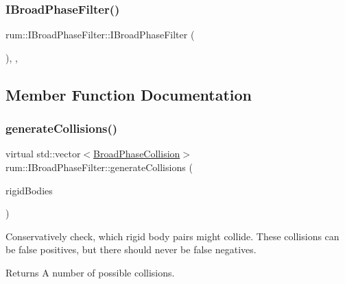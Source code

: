 \mbox{\label{classrum_1_1_i_broad_phase_filter_ae301bb63e91192f2edd60cd258ea02c7}} 
\subsubsection{\texorpdfstring{I\+Broad\+Phase\+Filter()}{IBroadPhaseFilter()}}
{\footnotesize\ttfamily rum\+::\+I\+Broad\+Phase\+Filter\+::\+I\+Broad\+Phase\+Filter (\begin{DoxyParamCaption}{ }\end{DoxyParamCaption})\hspace{0.3cm}{\ttfamily [explicit]}, {\ttfamily [protected]}, {\ttfamily [default]}}



\subsection{Member Function Documentation}
\mbox{\label{classrum_1_1_i_broad_phase_filter_a241cca5d9043353d7fb458b65b22eec0}} 
\subsubsection{\texorpdfstring{generate\+Collisions()}{generateCollisions()}}
{\footnotesize\ttfamily virtual std\+::vector$<$\mbox{\hyperlink{structrum_1_1_broad_phase_collision}{Broad\+Phase\+Collision}}$>$ rum\+::\+I\+Broad\+Phase\+Filter\+::generate\+Collisions (\begin{DoxyParamCaption}\item[{const std\+::vector$<$ \mbox{\hyperlink{classrum_1_1_rigid_body}{Rigid\+Body}} $\ast$$>$ \&}]{rigid\+Bodies }\end{DoxyParamCaption})\hspace{0.3cm}{\ttfamily [pure virtual]}}

Conservatively check, which rigid body pairs might collide. These collisions can be false positives, but there should never be false negatives. \begin{DoxyReturn}{Returns}
A number of possible collisions. 
\end{DoxyReturn}


